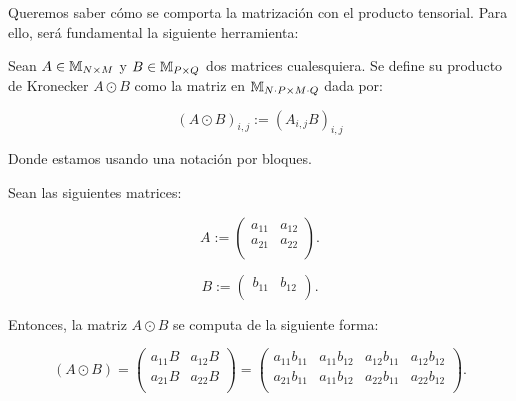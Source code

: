 Queremos saber cómo se comporta la matrización con el producto tensorial. Para ello, será fundamental la siguiente herramienta:

\begin{definicion}

    Sean $A \in \mathbb{M}_{N \times M}$ y  $B \in \mathbb{M}_{P \times Q}$ dos matrices cualesquiera. Se define su producto de Kronecker $A \odot B$ como la matriz en $\mathbb{M}_{N \cdot P \times M \cdot Q}$ dada por:

    \begin{equation}
        (A \odot B)_{i,j} := (A_{i, j} B)_{i, j}
    \end{equation}

    Donde estamos usando una notación por bloques.
\end{definicion}

\begin{ejemplo}

Sean las siguientes matrices:

    \begin{equation}
        A := \begin{pmatrix}
            a_{11} & a_{12} \\
            a_{21} & a_{22} \\
        \end{pmatrix}.
    \end{equation}

    \begin{equation}
        B := \begin{pmatrix}
            b_{11} & b_{12} \\
        \end{pmatrix}.
    \end{equation}

    Entonces, la matriz $A \odot B$ se computa de la siguiente forma:

    \begin{equation}
        (A \odot B) = \begin{pmatrix}
            a_{11}B & a_{12}B \\
            a_{21}B & a_{22}B \\
        \end{pmatrix} =
        \begin{pmatrix}
            a_{11} b_{11} & a_{11} b_{12} & a_{12} b_{11} & a_{12} b_{12} \\
            a_{21} b_{11} & a_{11} b_{12} & a_{22} b_{11} & a_{22} b_{12} \\
        \end{pmatrix}.
    \end{equation}

\end{ejemplo}

